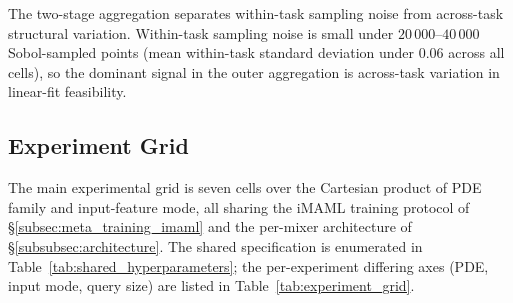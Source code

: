 \documentclass[10pt,journal,compsoc]{IEEEtran}
\begin{document}
The two-stage aggregation separates within-task sampling noise from
across-task structural variation. Within-task sampling noise is small
under $20\,000$--$40\,000$ Sobol-sampled points (mean within-task
standard deviation under $0.06$ across all cells), so the dominant
signal in the outer aggregation is across-task variation in linear-fit
feasibility. 

\subsection{Experiment Grid}\label{subsec:experiment_grid}

The main experimental grid is seven cells over the Cartesian product of
PDE family and input-feature mode, all sharing the iMAML training
protocol of \S\ref{subsec:meta_training_imaml} and the per-mixer
architecture of \S\ref{subsubsec:architecture}. The shared specification
is enumerated in Table~\ref{tab:shared_hyperparameters}; the
per-experiment differing axes (PDE, input mode, query size) are listed
in Table~\ref{tab:experiment_grid}.
\end{document}
